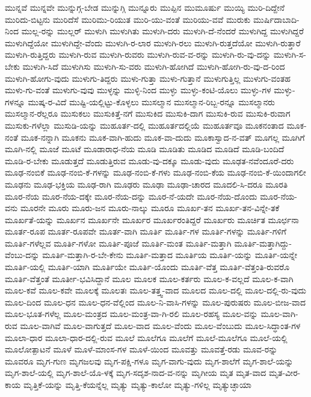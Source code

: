 ಮುನ್ನವೆ
ಮುನ್ನವೇ
ಮುನ್ನುಗ್ಗ-ಬೇಡ
ಮುನ್ನುಗ್ಗಿ
ಮುನ್ನೂರು
ಮುಪ್ಪಿನ
ಮುಮೂರ್ಷು
ಮುಯ್ಯಿ
ಮುರಿ-ದಿದ್ದೇನೆ
ಮುರಿದು-ಬಿಟ್ಟನು
ಮುರಿದೆಸೆ
ಮುರಿಮು-ರಿಯುತ
ಮುರಿ-ಯು-ವಂತೆ
ಮುರಿಯು-ವವೆ
ಮುರುಕು
ಮುರ್ಷಿದಾಬಾದಿ-ನಿಂದ
ಮುಲ್ಲ-ರನ್ನು
ಮುಲ್ಲರ್
ಮುಳುಗಿ
ಮುಳುಗಿತು
ಮುಳುಗಿ-ದರು
ಮುಳುಗಿ-ದೆ-ನೆಂದರೆ
ಮುಳುಗಿದ್ದ
ಮುಳುಗಿದ್ದರೆ
ಮುಳುಗಿದ್ದೆಯೋ
ಮುಳುಗಿದ್ದೇ-ವೆಂದು
ಮುಳುಗಿ-ರ-ಲಾರ
ಮುಳುಗಿ-ರಲು
ಮುಳುಗಿ-ರುತ್ತದೆಯೋ
ಮುಳುಗಿ-ರುತ್ತಾರೆ
ಮುಳುಗಿ-ರುತ್ತಿದ್ದರು
ಮುಳುಗಿ-ರುವ
ಮುಳುಗಿ-ರುವರು
ಮುಳುಗಿ-ರುವ-ವ-ರನ್ನು
ಮುಳುಗಿ-ರು-ವು-ದನ್ನು
ಮುಳುಗಿ-ಸ-ಬೇಕು
ಮುಳುಗಿ-ಸಿದೆ
ಮುಳುಗಿಸು
ಮುಳುಗಿ-ಸು-ವರು
ಮುಳುಗಿ-ಹೋಗಿದೆ
ಮುಳುಗಿ-ಹೋಗಿ-ರು-ವು-ದ-ರಿಂದ
ಮುಳುಗಿ-ಹೋಗು-ವುದು
ಮುಳುಗು-ತಿದ್ದರು
ಮುಳು-ಗುತ್ತಾ
ಮುಳು-ಗುತ್ತಾನೆ
ಮುಳುಗುತ್ತಿಲ್ಲ
ಮುಳುಗು-ವಂತಹ
ಮುಳು-ಗು-ವಂತೆ
ಮುಳುಗು-ವುವು
ಮುಳ್ಳನ್ನು
ಮುಳ್ಳಿ-ನಿಂದ
ಮುಳ್ಳು
ಮುಳ್ಳು-ಕಂಟಿ-ಯೊಲು
ಮುಳ್ಳು-ಗಳ
ಮುಳ್ಳು-ಗಳನ್ನೂ
ಮುಷ್ಕ-ರ-ವಿದೆ
ಮುಷ್ಟಿ-ಯಲ್ಲಿಟ್ಟು-ಕೊಳ್ಳಲು
ಮುಸಲ್ಮಾನ
ಮುಸಲ್ಮಾನ-ರಿಬ್ಬ-ರನ್ನೂ
ಮುಸಲ್ಮಾನರು
ಮುಸಲ್ಮಾನ-ರೆಲ್ಲರೂ
ಮುಸುಕಲು
ಮುಸುಕಿತ್ತೆ-ನಗೆ
ಮುಸುಕಿದ
ಮುಸುಕಿ-ದಾಗ
ಮುಸುಕಿ-ರುವ
ಮುಸುಕಿ-ರುವಾಗ
ಮುಸುಕು-ಗಳೆಲ್ಲಾ
ಮುಸುಡಿ-ಯನ್ನು
ಮುಹೂರ್ತ-ದಲ್ಲಿ
ಮುಹೂರ್ತದಲ್ಲಿಯೆ
ಮುಹೂರ್ತವೂ
ಮೂಕನಂತಾದ
ಮೂಕ-ನಂತೆ
ಮೂಕ-ನನ್ನಾಗಿ
ಮೂಕನು
ಮೂಕ-ವಾಗಿ-ಹುದು
ಮೂಕ-ವಾ-ದುದು
ಮೂಕಾಸ್ವಾದ-ನ-ವತ್
ಮೂಗಲ್ಲ
ಮೂಗಿಗೆ
ಮೂಗಿ-ನಲ್ಲಿ
ಮೂಜೆ
ಮೂಟೆ
ಮೂಡಾರಾಧ-ನೆಯ
ಮೂಡಿ
ಮೂಡಿತು
ಮೂಡಿದ
ಮೂಡಿದೆ
ಮೂಡಿ-ಬಂದಿದೆ
ಮೂಡಿ-ರ-ಬೇಕು
ಮೂಡುತ್ತದೆ
ಮೂಡುತ್ತಿರುವ
ಮೂಡು-ವು-ದಕ್ಕೂ
ಮೂಡು-ವುದು
ಮೂಢತ-ನವೆಂದೂರೆ-ದರು
ಮೂಢ-ನಂಬಿಕೆ
ಮೂಢ-ನಂಬಿ-ಕೆ-ಗಳನ್ನು
ಮೂಢ-ನಂಬಿ-ಕೆ-ಗಳು
ಮೂಢ-ನಂಬಿ-ಕೆಯ
ಮೂಢ-ನಂಬಿ-ಕೆ-ಯಿಂದಾಗಲೀ
ಮೂಢನು
ಮೂಢ-ಭಕ್ತಿಯ
ಮೂಢ-ರಾಗಿ
ಮೂಢರು
ಮೂಢಾ
ಮೂಢಾ-ಚಾರದ
ಮೂದಲಿ-ಸಿ-ದರೂ
ಮೂರತಿ
ಮೂರ-ನೆಯ
ಮೂರ-ನೆಯ-ದಕ್ಕೇ
ಮೂರ-ನೆಯ-ದನ್ನು
ಮೂರ-ನೆ-ಯದೇ
ಮೂರ-ನೆಯ-ದೊಂದು
ಮೂರ-ನೆಯ-ವನು
ಮೂರನೇ
ಮೂರು
ಮೂರು-ಜನ
ಮೂರು-ನಾಲ್ಕು
ಮೂರೂ
ಮೂರ್ಖ-ತನ
ಮೂರ್ಖ-ತನ-ವಿನ್ನೇ-ತಕೆ
ಮೂರ್ಖತೆ-ಯನ್ನು
ಮೂರ್ಖನ
ಮೂರ್ಖನೇ
ಮೂರ್ಖರ
ಮೂರ್ಖರಂತಿದ್ದರೆ
ಮೂರ್ಖರು
ಮೂರ್ಚಿತ
ಮೂರ್ಛನಾ
ಮೂರ್ತ-ರೂಪ
ಮೂರ್ತ-ರೂಪವೇ
ಮೂರ್ತ-ವಾಗಿ
ಮೂರ್ತಿ
ಮೂರ್ತಿ-ಗಳ
ಮೂರ್ತಿ-ಗಳನ್ನು
ಮೂರ್ತಿ-ಗಳಿಗೆ
ಮೂರ್ತಿ-ಗಳೆಲ್ಲವ
ಮೂರ್ತಿ-ಗಳೋ
ಮೂರ್ತಿ-ಪೂಜೆ
ಮೂರ್ತಿ-ಮಂತ
ಮೂರ್ತಿ-ಮತ್ತಾಗಿ
ಮೂರ್ತಿ-ಮತ್ತಾಗಿದ್ದು-ವೆಂಬು-ದನ್ನು
ಮೂರ್ತಿ-ಮತ್ತಾಗಿ-ರ-ಬೇ-ಕೇನು
ಮೂರ್ತಿ-ಮತ್ತಾದ
ಮೂರ್ತಿಯ
ಮೂರ್ತಿ-ಯನ್ನು
ಮೂರ್ತಿ-ಯನ್ನೇ
ಮೂರ್ತಿ-ಯಲ್ಲಿ
ಮೂರ್ತಿ-ಯಾಗಿ
ಮೂರ್ತಿಯೇ
ಮೂರ್ತಿ-ಯೊಂದು
ಮೂರ್ತಿ-ವೆತ್ತ
ಮೂರ್ತಿ-ವೆತ್ತಂತಿ-ರುವರೊ
ಮೂರ್ತಿ-ವೆತ್ತಂತೆ
ಮೂರ್ತೀ-ಭವಿಸಿದ್ದಾನೆ
ಮೂಲ
ಮೂಲಕ
ಮೂಲ-ಕರ್ತರು
ಮೂಲ-ಕ-ವಲ್ಲದೆ
ಮೂಲ-ಕ-ವಾಗಿ
ಮೂಲ-ಕವೆ
ಮೂಲ-ಕವೇ
ಮೂಲಕ್ಕೆ
ಮೂಲತಃ
ಮೂಲ-ತತ್ತ್ವ-ವಾದ
ಮೂಲದ
ಮೂಲ-ದಲ್ಲಿ
ಮೂಲ-ದಲ್ಲಿ-ರು-ವುದು
ಮೂಲ-ದಿಂದ
ಮೂಲ-ಧನ
ಮೂಲ-ಧನ-ವೆಲ್ಲಿಂದ
ಮೂಲ-ನಿ-ವಾಸಿ-ಗಳನ್ನು
ಮೂಲ-ಪುರುಷರು
ಮೂಲ-ಬೀಜ-ವಾದ
ಮೂಲ-ಭೂತ-ಗಳೆಲ್ಲ
ಮೂಲ-ಮಂತ್ರದ
ಮೂಲ-ಮಂತ್ರ-ವಾ-ಗಿ-ರಲಿ
ಮೂಲ-ರಹಸ್ಯ
ಮೂಲ-ವನ್ನು
ಮೂಲ-ವಾಗಿ-ರುವ
ಮೂಲ-ವಾಗಿವೆ
ಮೂಲ-ವಾಗುತ್ತದೆ
ಮೂಲ-ವಾದ
ಮೂಲ-ವೆಂದು
ಮೂಲ-ವೆಂಬುದು
ಮೂಲ-ಸಿದ್ಧಾಂತ-ಗಳ
ಮೂಲಾ-ಧಾರ
ಮೂಲಾ-ಧಾರ-ದಲ್ಲಿ-ರುವ
ಮೂಲೆ
ಮೂಲೆಗೂ
ಮೂಲೆಗೆ
ಮೂಲೆ-ಮೂಲೆಗೂ
ಮೂಲೆ-ಯಲ್ಲಿ
ಮೂಲೋತ್ಪಾಟನೆ
ಮೂಳೆ
ಮೂಳೆ-ಮಾಂಸ-ಗಳ
ಮೂಳೆ-ಯಿಂದ
ಮೂವತ್ತು
ಮೂವತ್ತೆ-ರಡು
ಮೂವ-ರನ್ನು
ಮೂವರೂ
ಮೃಗ-ಗುಣ
ಮೃಗಜಲವು
ಮೃಗ-ಪಕ್ಷಿ-ಗಳೂ
ಮೃಗ-ವಾಗು-ವುದು
ಮೃಗ-ಶಾಲೆಗೆ
ಮೃಗ-ಶಾಲೆ-ಯನ್ನು
ಮೃಗ-ಶಾಲೆ-ಯಲ್ಲಿ
ಮೃಗ-ಶಾಲೆ-ಯೊ-ಳಕ್ಕೆ
ಮೃಗ-ಸದೃಶ-ನಾದ-ವ-ನನ್ನು
ಮೃಗೀಯ
ಮೃತ
ಮೃತ-ವಾದ
ಮೃತ-ವೀರ-ಕಾಯ
ಮೃತ್ತಿಕೆ-ಯನ್ನು
ಮೃತ್ತಿ-ಕೆಯನ್ನೆಲ್ಲ
ಮೃತ್ಯು
ಮೃತ್ಯು-ಕಾಲೋ
ಮೃತ್ಯು-ಗಳಿಲ್ಲ
ಮೃತ್ಯುಚ್ಛಾಯಾ
